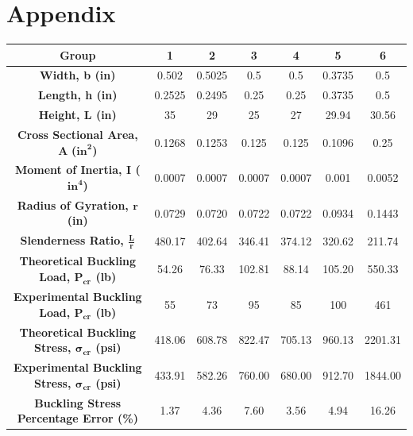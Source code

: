 \documentclass{article}
\begin{document}
    \section{Appendix}
    \begin{center}
        \doublespacing
    \begin{tabular}{|c|c|c|c|c|c|c|}
        \hline
            \textbf{Group} & \textbf{1} & \textbf{2} & \textbf{3}& \textbf{4} & \textbf{5} & \textbf{6} \\ \hline
            \textbf{Width, b (in)} & 0.502 & 0.5025 & 0.5 & 0.5 & 0.3735 & 0.5 \\ \hline
            \textbf{Length, h (in)} & 0.2525 & 0.2495 & 0.25 & 0.25 & 0.3735 & 0.5 \\ \hline
            \textbf{Height, L (in)} & 35 & 29 & 25 & 27 & 29.94 & 30.56 \\ \hline
            \textbf{Cross Sectional Area, A} \textbf{(\(\textbf{in}^{\bm{2}}\))} & 0.1268 & 0.1253 & 0.125 & 0.125 & 0.1096 & 0.25 \\ \hline
            \textbf{Moment of Inertia, I (\(\textbf{in}^{\bm{4}}\))} & 0.0007 & 0.0007 & 0.0007 & 0.0007 & 0.001 & 0.0052 \\ \hline
            \textbf{Radius of Gyration, \(\bm{r}\) (in)} & 0.0729 & 0.0720 & 0.0722 & 0.0722 & 0.0934 & 0.1443 \\ \hline
            \textbf{Slenderness Ratio, \(\bm{\frac{L}{r}}\)} & 480.17 & 402.64 & 346.41 & 374.12 & 320.62 & 211.74 \\ \hline
            \textbf{Theoretical Buckling Load, \textbf{\(\textbf{P}_\textbf{cr}\) (lb)}} & 54.26 & 76.33 & 102.81 & 88.14 & 105.20 & 550.33 \\ \hline
            \textbf{Experimental Buckling Load, \textbf{\(\textbf{P}_\textbf{cr}\) (lb)}} & 55 & 73 & 95 & 85 & 100 & 461 \\ \hline
            \textbf{Theoretical Buckling Stress,  \(\bm{\sigma}_\textbf{cr}\) (psi)} & 418.06 & 608.78 & 822.47 & 705.13 & 960.13 & 2201.31 \\ \hline 
            \textbf{Experimental Buckling Stress,  \(\bm{\sigma}_\textbf{cr}\) (psi)} & 433.91 & 582.26 & 760.00 & 680.00 & 912.70 & 1844.00 \\ \hline
            \textbf{Buckling Stress Percentage Error (\%)} & 1.37 & 4.36 &7.60 & 3.56 & 4.94 & 16.26 \\\hline
        \end{tabular}
    \end{center}
\end{document}
